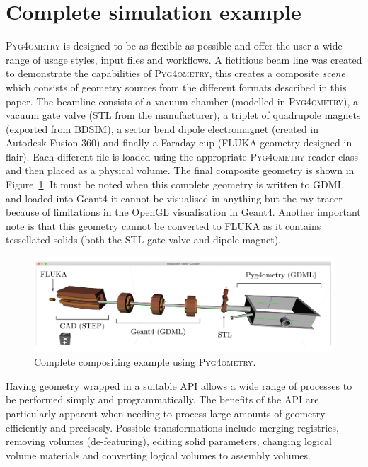 \documentclass[final,5p,times,twocolumn]{elsarticle}
\newcommand{\PYGEOMETRY}{\textsc{Pyg4ometry}}
\begin{document}
\section{Complete simulation example}
\PYGEOMETRY{} is designed to be as flexible as possible and offer the user a wide range of usage styles, input files 
and workflows. A fictitious beam line was created to demonstrate the capabilities of \PYGEOMETRY, this creates a composite 
\emph{scene} which consists of geometry sources from the different formats described in this paper. The beamline consists of a vacuum chamber 
(modelled in \PYGEOMETRY{}), a vacuum gate valve (STL from the manufacturer), a triplet of quadrupole magnets (exported 
from BDSIM), a sector bend dipole electromagnet (created in Autodesk Fusion 360) and finally a Faraday cup (FLUKA geometry designed in 
flair). Each different file is loaded using the appropriate \PYGEOMETRY{} reader class and then placed as a physical volume. The final composite 
geometry is shown in Figure~\ref{fig:model}. It must be noted when this complete geometry is written to GDML and loaded into 
Geant4 it cannot be visualised in anything but the ray tracer because of limitations in the OpenGL visualisation in Geant4. Another 
important note is that this geometry cannot be converted to FLUKA as it contains tessellated solids (both the STL gate valve and
dipole magnet). 
%
\begin{figure}
\begin{center}
\includegraphics[width=1.0\textwidth]{./model-scene/model.pdf}
\caption{Complete compositing example using \PYGEOMETRY{}.}
\label{fig:model}
\end{center}
\end{figure}

Having geometry wrapped in a suitable API allows a wide range of processes to be performed simply and programmatically. The benefits of the API are
particularly apparent when needing to process large amounts of geometry efficiently and precisesly. Possible transformations include merging registries, 
removing volumes (de-featuring), editing solid parameters, changing logical volume materials and converting logical volumes to assembly volumes.
\end{document}
